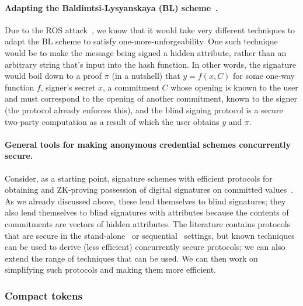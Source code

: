 \paragraph{Adapting the Baldimtsi-Lysyanskaya (BL) scheme~\cite{CCS:BalLys13}.} Due to the ROS attack~\cite{EC:BLLOR21}, we know that it would take very different techniques to adapt the BL scheme to satisfy one-more-unforgeability.  One such technique would be to make the message being signed a hidden attribute, rather than an arbitrary string that's input into the hash function.  In other words, the signature would boil down to a proof $\pi$ (in a nutshell) that $y = f(x,C)$ for some one-way function $f$, signer's secret $x$, a commitment $C$ whose opening is known to the user and must correspond to the opening of another commitment, known to the signer (the protocol already enforces this), and the blind signing protocol is a secure two-party computation as a result of which the user obtains $y$ and $\pi$.  %

\paragraph{General tools for making anonymous credential schemes concurrently secure.} Consider, as a starting point, signature schemes with efficient protocols for obtaining and ZK-proving possession of digital signatures on committed values~\cite{lysyan02a,camlys02b}.  As we already discussed above, these lend themselves to blind signatures; they also lend themselves to blind signatures with attributes because the contents of commitments are vectors of hidden attributes.  The literature contains protocols that are secure in the stand-alone~\cite{C:CamLys04} or sequential~\cite{lysyan02a} settings, but known techniques~\cite{lysros22} can be used to derive (less efficient) concurrently secure protocols; we can also extend the range of techniques that can be used.  We can then work on simplifying such protocols and making them more efficient.

\subsubsection{Compact tokens}
\label{rg1:compact}

